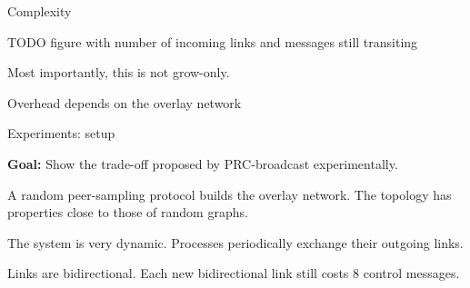 \documentclass[10pt, xcolor={usenames, dvipsnames}]{beamer}
\begin{document}
\begin{frame}{Complexity}

  \begin{table}
    \begin{center}
      
    \end{center}
  \end{table}

  TODO figure with number of incoming links and messages still transiting

  Most importantly, this is not grow-only.

\end{frame}

\begin{frame}{Overhead depends on the overlay network}


  

  \begin{center}
    \begin{table}
      \begin{center}
        
      \end{center}
    \end{table}
  \end{center}

\end{frame}


\begin{frame}{Experiments: setup}
  
  \textbf{Goal:} Show the trade-off proposed by PRC-broadcast experimentally.

  \vspace{2em}

  A random peer-sampling protocol builds the overlay network. The topology has
  properties close to those of random graphs.

  \vspace{1em}
  
  The system is very dynamic. Processes periodically exchange their outgoing
  links.
  
  \vspace{1em}
  
  Links are bidirectional. Each new bidirectional link still costs 8 control
  messages.
    
\end{frame}
\end{document}

